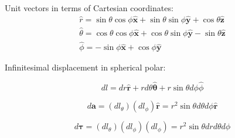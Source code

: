 Unit vectors in terms of Cartesian coordinates:
\begin{equation}
\begin{gathered}
\hat{r} = \sin{\theta}\cos{\phi}\mathbf{\hat{x}} + \sin{\theta}\sin{\phi} \mathbf{\hat{y}} +\cos{\theta}\mathbf{\hat{z}} \\
\hat{\theta} = \cos{\theta}\cos{\phi}\mathbf{\hat{x}}+ \cos{\theta}\sin{\phi}\mathbf{\hat{y}} - \sin{\theta}\mathbf{\hat{z} }\\
\hat{\phi} = -\sin{\phi}\mathbf{\hat{x}}+\cos{\phi} \mathbf{\hat{y}}
\end{gathered}
\end{equation}

Infinitesimal displacement in spherical polar:

\begin{equation}
dl =dr\mathbf{\hat{r}} + rd\theta \mathbf{\hat{\theta}} +r\sin{\theta}d\phi\hat{\phi}
\end{equation}

\begin{equation}
d\mathbf{a}=(dl_\theta)(dl_\phi)\mathbf{\hat{r}} = r^2\sin{\theta}d\theta d\phi \mathbf{\hat{r}}
\end{equation}

\begin{equation}
d\mathbf{\tau}=(dl_\theta)(dl_\phi)(dl_\phi) = r^2\sin{\theta}drd\theta d\phi
\end{equation}





